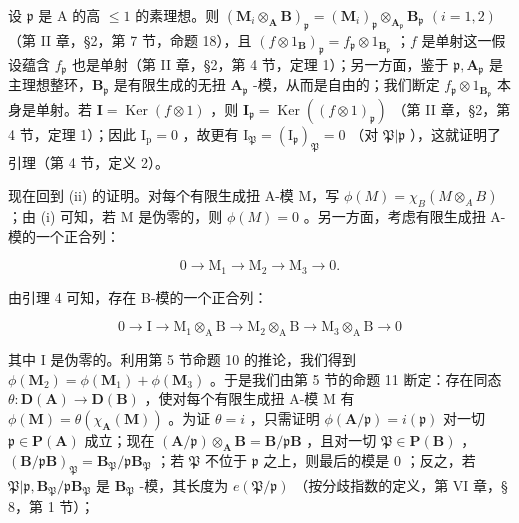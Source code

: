 设 \(\mathfrak{p}\) 是 A 的高 \(\leqslant 1\) 的素理想。则 \((\mathbf{M}_i\otimes_{\mathbf{A}}\mathbf{B})_{\mathfrak{p}} = (\mathbf{M}_i)_{\mathfrak{p}}\otimes_{\mathbf{A}_{\mathfrak{p}}}\mathbf{B}_{\mathfrak{p}}\) \((i = 1,2)\) （第 II 章，§2，第 7 节，命题 18），且 \((f\otimes 1_{\mathbf{B}})_{\mathfrak{p}} = f_{\mathfrak{p}}\otimes 1_{\mathbf{B}_{\mathfrak{p}}}\) ；\(f\) 是单射这一假设蕴含 \(f_{\mathfrak{p}}\) 也是单射（第 II 章，§2，第 4 节，定理 1）；另一方面，鉴于 \(\mathfrak{p},\mathbf{A}_{\mathfrak{p}}\) 是主理想整环，\(\mathbf{B}_{\mathfrak{p}}\) 是有限生成的无扭 \(\mathbf{A}_{\mathfrak{p}}\) -模，从而是自由的；我们断定 \(f_{\mathfrak{p}}\otimes 1_{\mathbf{B}_{\mathfrak{p}}}\) 本身是单射。若 \(\mathbf{I} = \operatorname {Ker}(f\otimes 1)\) ，则 \(\mathbf{I}_{\mathfrak{p}} = \operatorname {Ker}((f\otimes 1)_{\mathfrak{p}})\) （第 II 章，§2，第 4 节，定理 1）；因此 \(\mathrm{I_p} = 0\) ，故更有 \(\mathrm{I}_{\mathfrak{P}} = (\mathrm{I}_{\mathfrak{p}})_{\mathfrak{P}} = 0\) （对 \(\mathfrak{P}| \mathfrak{p}\) ），这就证明了引理（第 4 节，定义 2）。

现在回到 (ii) 的证明。对每个有限生成扭 A-模 M，写 \(\phi(M) = \chi_{B}(M \otimes_{A} B)\) ；由 (i) 可知，若 M 是伪零的，则 \(\phi(M) = 0\) 。另一方面，考虑有限生成扭 A-模的一个正合列：

\[
0 \rightarrow \mathrm{M} _ {1} \rightarrow \mathrm{M} _ {2} \rightarrow \mathrm{M} _ {3} \rightarrow 0.
\]

由引理 4 可知，存在 B-模的一个正合列：

\[
0 \rightarrow \mathrm{I} \rightarrow \mathrm{M} _ {1} \otimes_ {\mathrm{A}} \mathrm{B} \rightarrow \mathrm{M} _ {2} \otimes_ {\mathrm{A}} \mathrm{B} \rightarrow \mathrm{M} _ {3} \otimes_ {\mathrm{A}} \mathrm{B} \rightarrow 0
\]

其中 I 是伪零的。利用第 5 节命题 10 的推论，我们得到 \(\phi(\mathbf{M}_2) = \phi(\mathbf{M}_1) + \phi(\mathbf{M}_3)\) 。于是我们由第 5 节的命题 11 断定：存在同态 \(\theta: \mathbf{D}(\mathbf{A}) \to \mathbf{D}(\mathbf{B})\) ，使对每个有限生成扭 A-模 M 有 \(\phi(\mathbf{M}) = \theta(\chi_{\mathbf{A}}(\mathbf{M}))\) 。为证 \(\theta = i\) ，只需证明 \(\phi(\mathbf{A}/\mathfrak{p}) = i(\mathfrak{p})\) 对一切 \(\mathfrak{p} \in \mathbf{P}(\mathbf{A})\) 成立；现在 \((\mathbf{A}/\mathfrak{p}) \otimes_{\mathbf{A}} \mathbf{B} = \mathbf{B}/\mathfrak{p}\mathbf{B}\) ，且对一切 \(\mathfrak{P} \in \mathbf{P}(\mathbf{B})\) ，\((\mathbf{B}/\mathfrak{p}\mathbf{B})_{\mathfrak{P}} = \mathbf{B}_{\mathfrak{P}}/\mathfrak{p}\mathbf{B}_{\mathfrak{P}}\) ；若 \(\mathfrak{P}\) 不位于 \(\mathfrak{p}\) 之上，则最后的模是 0 ；反之，若 \(\mathfrak{P}| \mathfrak{p}, \mathbf{B}_{\mathfrak{P}}/\mathfrak{p}\mathbf{B}_{\mathfrak{P}}\) 是 \(\mathbf{B}_{\mathfrak{P}}\) -模，其长度为 \(e(\mathfrak{P}/\mathfrak{p})\) （按分歧指数的定义，第 VI 章，§ 8，第 1 节）；

